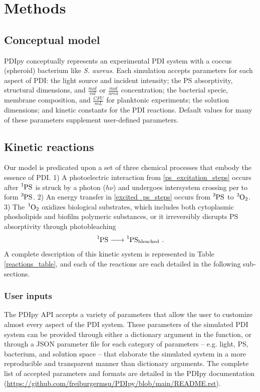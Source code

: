 \section{Methods}
\subsection{Conceptual model}
PDIpy conceptually represents an experimental PDI system with a coccus (spheroid) bacterium like \textit{S. aureus}. Each simulation accepts parameters for each aspect of PDI: the light source and incident intensity; the PS absorptivity, structural dimensions, and $\frac{mol}{vol}$ or $\frac{mol}{area}$ concentration; the bacterial specie, membrane composition, and $\frac{CFU}{mL}$ for planktonic experiments; the solution dimensions; and kinetic constants for the PDI reactions. Default values for many of these parameters supplement user-defined parameters.

\subsection{Kinetic reactions}
Our model is predicated upon a set of three chemical processes that embody the essence of PDI. 1) A photoelectric interaction \cite{Wheaton2009PhotoelectricEffect} from \cref{ps_excitation_steps} occurs after $\ce{^1PS}$ is struck by a photon ($h\nu$) and undergoes intersystem crossing per to form $\ce{^3PS}$. 2) An energy transfer in \cref{excited_ps_steps} occurs from $\ce{^3PS}$ to $\ce{^3O2}$. 3) The $\ce{^1O2}$ oxidizes biological substrates, which includes both cytoplasmic phosholipids and biofilm polymeric substances, or it irreversibly disrupts PS absorptivity through photobleaching 
\begin{equation} \label{bleaching}
    \ce{^1PS -> ^1PS_{bleached}}~.
\end{equation}
A complete description of this kinetic system is represented in Table \ref{reactions_table}, and each of the reactions are each detailed in the following sub-sections.

\subsubsection{User inputs}
The PDIpy API accepts a variety of parameters that allow the user to customize almost every aspect of the PDI system. These parameters of the simulated PDI system can be provided through either a dictionary argument in the  function, or through a JSON parameter file for each category of parameters -- e.g. light, PS, bacterium, and solution space -- that elaborate the simulated system in a more reproducible and transparent manner than dictionary arguments. The complete list of accepted parameters and formats are detailed in the PDIpy documentation (\url{https://github.com/freiburgermsu/PDIpy/blob/main/README.rst}).

